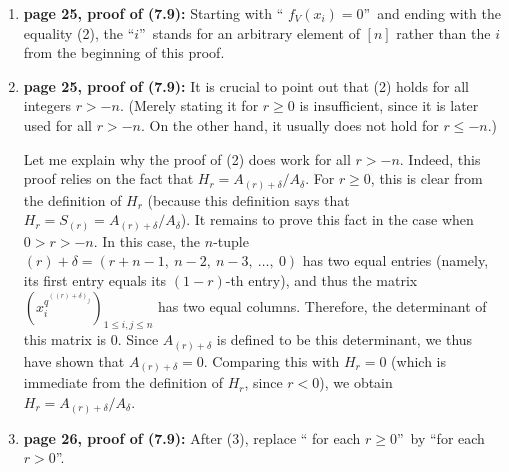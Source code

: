 \documentclass[numbers=enddot,12pt,final,onecolumn,notitlepage]{scrartcl}%
\theoremstyle{definition}
\begin{document}
\begin{enumerate}
Again, this can be done by observing that both matrices belong to the group
$\operatorname*{UT}\nolimits_{\mathbb{Z}}$ of all upper unitriangular matrices
with rows and columns indexed by all integers.

\item \textbf{page 25, proof of (7.9):} Starting with \textquotedblleft%
$f_{V}\left(  x_{i}\right)  =0$\textquotedblright\ and ending with the
equality (2), the \textquotedblleft$i$\textquotedblright\ stands for an
arbitrary element of $\left[  n\right]  $ rather than the $i$ from the
beginning of this proof.

\item \textbf{page 25, proof of (7.9):} It is crucial to point out that (2)
holds for all integers $r>-n$. (Merely stating it for $r\geq0$ is
insufficient, since it is later used for all $r>-n$. On the other hand, it
usually does not hold for $r\leq-n$.)

Let me explain why the proof of (2) does work for all $r>-n$. Indeed, this
proof relies on the fact that $H_{r}=A_{\left(  r\right)  +\delta}/A_{\delta}%
$. For $r\geq0$, this is clear from the definition of $H_{r}$ (because this
definition says that $H_{r}=S_{\left(  r\right)  }=A_{\left(  r\right)
+\delta}/A_{\delta}$). It remains to prove this fact in the case when
$0>r>-n$. In this case, the $n$-tuple $\left(  r\right)  +\delta=\left(
r+n-1,\ n-2,\ n-3,\ \ldots,\ 0\right)  $ has two equal entries (namely, its
first entry equals its $\left(  1-r\right)  $-th entry), and thus the matrix
$\left(  x_{i}^{q^{\left(  \left(  r\right)  +\delta\right)  _{j}}}\right)
_{1\leq i,j\leq n}$ has two equal columns. Therefore, the determinant of this
matrix is $0$. Since $A_{\left(  r\right)  +\delta}$ is defined to be this
determinant, we thus have shown that $A_{\left(  r\right)  +\delta}=0$.
Comparing this with $H_{r}=0$ (which is immediate from the definition of
$H_{r}$, since $r<0$), we obtain $H_{r}=A_{\left(  r\right)  +\delta
}/A_{\delta}$.

\item \textbf{page 26, proof of (7.9):} After (3), replace \textquotedblleft
for each $r\geq0$\textquotedblright\ by \textquotedblleft for each
$r>0$\textquotedblright.


\end{enumerate}
\end{document}
